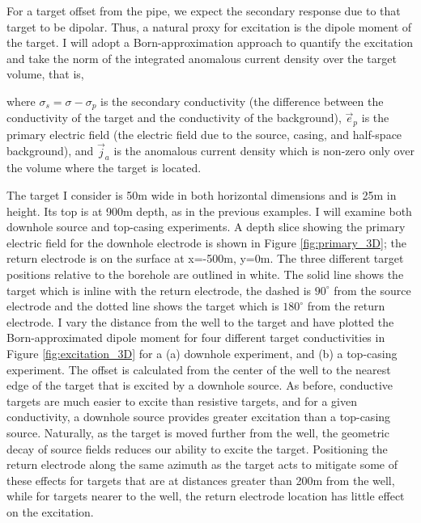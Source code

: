 For a target offset from the pipe, we expect the secondary response due to that target to be dipolar. Thus, a natural proxy for excitation is the dipole moment of the target. I will adopt a Born-approximation approach to quantify the excitation and take the norm of the integrated anomalous current density over the target volume, that is,

where $\sigma_s = \sigma - \sigma_p$ is the secondary conductivity (the difference between the conductivity of the target and the conductivity of the background), $\vec{e}_p$ is the primary electric field (the electric field due to the source, casing, and half-space background), and $\vec{j}_a$ is the anomalous current density which is non-zero only over the volume where the target is located.

The target I consider is 50m wide in both horizontal dimensions and is 25m in height. Its top is at 900m depth, as in the previous examples. I will examine both downhole source and top-casing experiments. A depth slice showing the primary electric field for the downhole electrode is shown in Figure \ref{fig:primary_3D}; the return electrode is on the surface at x=-500m, y=0m. The three different target positions relative to the borehole are outlined in white. The solid line shows the target which is inline with the return electrode, the dashed is $90^\circ$ from the source electrode and the dotted line shows the target which is $180^\circ$ from the return electrode. I vary the distance from the well to the target and have plotted the Born-approximated dipole moment for four different target conductivities in Figure \ref{fig:excitation_3D} for a (a) downhole experiment, and (b) a top-casing experiment. The offset is calculated from the center of the well to the nearest edge of the target that is excited by a downhole source. As before, conductive targets are much easier to excite than resistive targets, and for a given conductivity, a downhole source provides greater excitation than a top-casing source. Naturally, as the target is moved further from the well, the geometric decay of source fields reduces our ability to excite the target. Positioning the return electrode along the same azimuth as the target acts to mitigate some of these effects for targets that are at distances greater than 200m from the well, while for targets nearer to the well, the return electrode location has little effect on the excitation.







